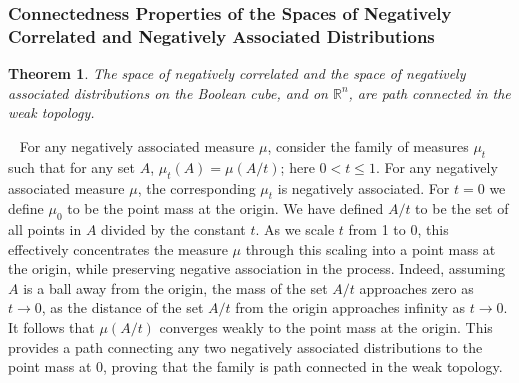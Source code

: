 \documentclass[11pt]{article}
\newcommand{\R}{\mathbb{R}}
\newtheorem{thm}{Theorem}
\newenvironment{Proof}{\noindent{\bf Proof} \ }{\QED}\smallskip
\newcommand\QED{\newline \rightline{$\blacksquare$} \bigskip}
\begin{document}
  
         
\subsubsection{Connectedness Properties of the Spaces of Negatively Correlated and Negatively Associated Distributions}        
\begin{thm}
The space of negatively correlated and the space of negatively associated distributions on the Boolean cube, and on $\R^n$, are path connected in the weak topology.





\end{thm} 
\begin{Proof}
For any negatively associated measure $\mu$, consider the family of measures $\mu_t$ such that for any set $A$, $\mu_t(A) = \mu(A/t)$; here $0< t\leq 1$. %
For any negatively associated measure $\mu$, the corresponding $\mu_t$ is negatively associated. 
For $t=0$ we define $\mu_0$ to be the point mass at the origin. We have defined $A/t$ to be the set of all points in $A$ divided by the constant $t$. As we scale $t$ from 1 to 0, this effectively concentrates the measure $\mu$ through this scaling into a point mass at the origin, while preserving negative association in the process. Indeed, assuming $A$ is a ball away from the origin, the mass of the set $A/t$ approaches zero as $t\to 0$, as the distance of the set $A/t$ from the origin approaches infinity as $t\to 0$. It follows that $\mu(A/t)$ converges weakly to the point mass at the origin. This provides a path connecting any two negatively associated distributions to the point mass at 0, proving that the family is path connected in the weak topology. 
\end{Proof}
\end{document}
